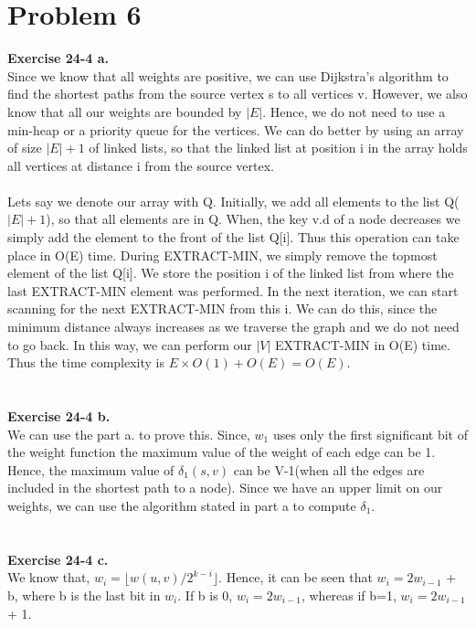 \documentclass[10pt]{article}
\begin{document}
\section{Problem 6}
\textbf{Exercise 24-4 a.}\\
Since we know that all weights are positive, we can use Dijkstra's algorithm to find the shortest paths from the source vertex s to all vertices v. However, we also know that all our weights are bounded by $|E|$. Hence, we do not need to use a min-heap or a priority queue for the vertices. We can do better by using an array of size $|E|+1$ of linked lists, so that the linked list at position i in the array holds all vertices at distance i from the source vertex.\\\\
Lets say we denote our array with Q. Initially, we add all elements to the list Q($|E|+1$), so that all elements are in Q. When, the key v.d of a node decreases we simply add the element to the front of the list Q[i]. Thus this operation can take place in O(E) time. During EXTRACT-MIN, we simply remove the topmost element of the list Q[i]. We store the position i of the linked list from where the last EXTRACT-MIN element was performed. In the next iteration, we can start scanning for the next EXTRACT-MIN from this i. We can do this, since the minimum distance always increases as we traverse the graph and we do not need to go back. In this way, we can perform our $|V|$ EXTRACT-MIN in O(E) time.
Thus the time complexity is $E \times O(1) + O(E) = O(E)$.\\\\\\
\textbf{Exercise 24-4 b.}\\
We can use the part a. to prove this. Since, $w_1$ uses only the first significant bit of the weight function the maximum value of the weight of each edge can be 1. Hence, the maximum value of $\delta_1(s, v)$ can be V-1(when all the edges are included in the shortest path to a node). Since we have an upper limit on our weights, we can use the algorithm stated in part a to compute $\delta_1$.\\\\\\
\textbf{Exercise 24-4 c.}\\
We know that, $w_i = \lfloor w(u,v)/2^{k-i} \rfloor$. Hence, it can be seen that $w_i = 2w_{i-1}$ + b, where b is the last bit in $w_i$. If b is 0, $w_i = 2w_{i-1}$, whereas if b=1, $w_i = 2w_{i-1}$ + 1.\\\\
\end{document}

